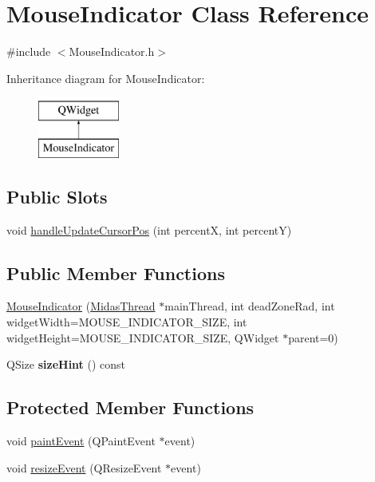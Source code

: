 \hypertarget{class_mouse_indicator}{\section{Mouse\+Indicator Class Reference}
\label{class_mouse_indicator}
}


{\ttfamily \#include $<$Mouse\+Indicator.\+h$>$}

Inheritance diagram for Mouse\+Indicator\+:\begin{figure}[H]
\begin{center}
\leavevmode
\includegraphics[height=2.000000cm]{class_mouse_indicator}
\end{center}
\end{figure}
\subsection*{Public Slots}
\begin{DoxyCompactItemize}
\item 
void \hyperlink{class_mouse_indicator_a11748453ba0171fadd0e6b73667f84b0}{handle\+Update\+Cursor\+Pos} (int percent\+X, int percent\+Y)
\end{DoxyCompactItemize}
\subsection*{Public Member Functions}
\begin{DoxyCompactItemize}
\item 
\hyperlink{class_mouse_indicator_a8e6ee604141f846c178c0e0d13d20ce4}{Mouse\+Indicator} (\hyperlink{class_midas_thread}{Midas\+Thread} $\ast$main\+Thread, int dead\+Zone\+Rad, int widget\+Width=M\+O\+U\+S\+E\+\_\+\+I\+N\+D\+I\+C\+A\+T\+O\+R\+\_\+\+S\+I\+Z\+E, int widget\+Height=M\+O\+U\+S\+E\+\_\+\+I\+N\+D\+I\+C\+A\+T\+O\+R\+\_\+\+S\+I\+Z\+E, Q\+Widget $\ast$parent=0)
\item 
\hypertarget{class_mouse_indicator_a019f2fb2ad443a461f1b937e8aaa343c}{Q\+Size {\bfseries size\+Hint} () const }\label{class_mouse_indicator_a019f2fb2ad443a461f1b937e8aaa343c}

\end{DoxyCompactItemize}
\subsection*{Protected Member Functions}
\begin{DoxyCompactItemize}
\item 
void \hyperlink{class_mouse_indicator_a64de61642d4f219be8e468b654e833b6}{paint\+Event} (Q\+Paint\+Event $\ast$event)
\item 
void \hyperlink{class_mouse_indicator_af429d45e7abc7079fac4b0574dd4b983}{resize\+Event} (Q\+Resize\+Event $\ast$event)
\end{DoxyCompactItemize}



